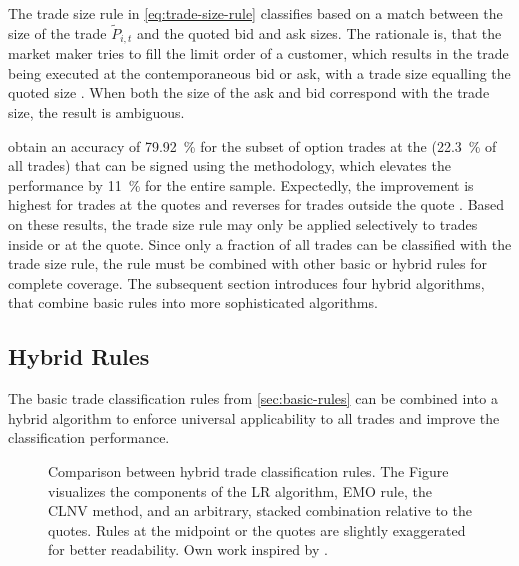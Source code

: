 The trade size rule in \cref{eq:trade-size-rule} classifies based on a match between the size of the trade $\tilde{P}_{i, t}$ and the quoted bid and ask sizes. The rationale is, that the market maker tries to fill the limit order of a customer, which results in the trade being executed at the contemporaneous bid or ask, with a trade size equalling the quoted size \autocite[][13]{grauerOptionTradeClassification2022}. When both the size of the ask and bid correspond with the trade size, the result is ambiguous.

\textcite[][13]{grauerOptionTradeClassification2022} obtain an accuracy of \SI{79.92}{\percent} for the subset of option trades at the  (\SI{22.3}{\percent} of all trades) that can be signed using the methodology, which elevates the performance by \SI{11}{\percent} for the entire sample. Expectedly, the improvement is highest for trades at the quotes and reverses for trades outside the quote \autocite[][15]{grauerOptionTradeClassification2022}. Based on these results, the trade size rule may only be applied selectively to trades inside or at the quote. Since only a fraction of all trades can be classified with the trade size rule, the rule must be combined with other basic or hybrid rules for complete coverage. The subsequent section introduces four hybrid algorithms, that combine basic rules into more sophisticated algorithms.

\subsection{Hybrid Rules}\label{sec:hybrid-rules}

The basic trade classification rules from \cref{sec:basic-rules} can be combined into a hybrid algorithm to enforce universal applicability to all trades and improve the classification performance.


\begin{figure}[ht!]
    \hfill
    \hfill\null
    \caption[Comparison Between Hybrid Trade Classification Rules]{Comparison between hybrid trade classification rules. The Figure visualizes the components of the \acrshort{LR} algorithm, \acrshort{EMO} rule, the \acrshort{CLNV} method, and an arbitrary, stacked combination relative to the quotes. Rules at the midpoint or the quotes are slightly exaggerated for better readability. Own work inspired by \textcite[][167]{poppeSensitivityVPINChoice2016}.}
    \label{fig:hybrid-algorithms}
\end{figure}

